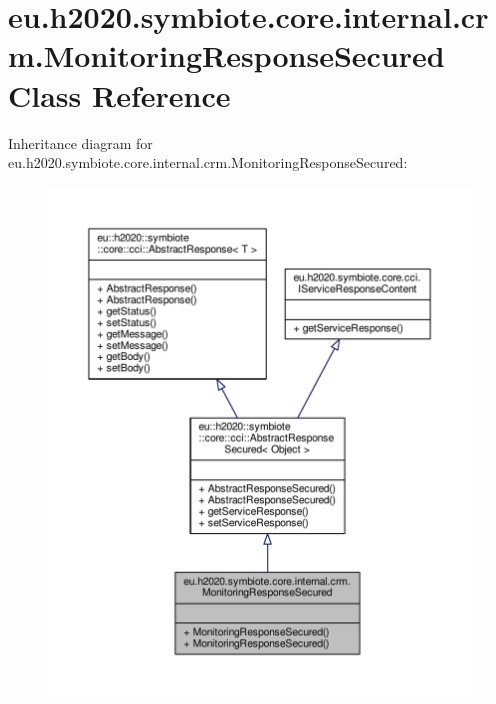 \hypertarget{classeu_1_1h2020_1_1symbiote_1_1core_1_1internal_1_1crm_1_1MonitoringResponseSecured}{}\section{eu.\+h2020.\+symbiote.\+core.\+internal.\+crm.\+Monitoring\+Response\+Secured Class Reference}
\label{classeu_1_1h2020_1_1symbiote_1_1core_1_1internal_1_1crm_1_1MonitoringResponseSecured}


Inheritance diagram for eu.\+h2020.\+symbiote.\+core.\+internal.\+crm.\+Monitoring\+Response\+Secured\+:
\nopagebreak
\begin{figure}[H]
\begin{center}
\leavevmode
\includegraphics[width=350pt]{classeu_1_1h2020_1_1symbiote_1_1core_1_1internal_1_1crm_1_1MonitoringResponseSecured__inherit__graph}
\end{center}
\end{figure}


